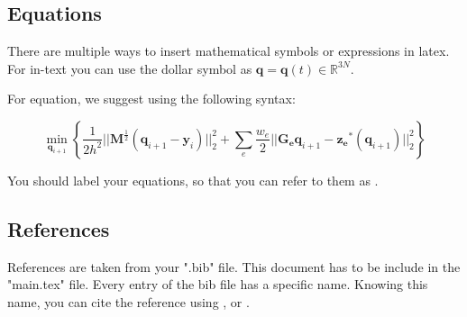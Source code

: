 \subsection{Equations}\label{equations}

There are multiple ways to insert mathematical symbols or expressions in latex. For in-text you can use the dollar symbol as $\bm{q}=\bm{q}(t)\in \mathbb{R}^{3N}$. 

For equation, we suggest using the following syntax:

    \begin{equation}\label{optimization_problem}
        \min_{\bm{q}_{i+1}}\left\{ \frac{1}{2h^2}||\bm{M}^{\frac{1}{2}}(\bm{q}_{i+1}-\bm{y}_i)||_2^2 + \sum_e \frac{w_e}{2}||\bm{G_e}\bm{q}_{i+1}-\bm{z_e}^\ast (\bm{q}_{i+1})||_2^2 \right\}
    \end{equation}
    
You should label your equations, so that you can refer to them as .


\subsection{References}\label{references}

References are taken from your ".bib" file. This document has to be include in the "main.tex" file. Every entry of the bib file has a specific name. Knowing this name, you can cite the reference using \citep{Bouaziz2014}, \citet{Bouaziz2014} or \cite{Bouaziz2014}. 
